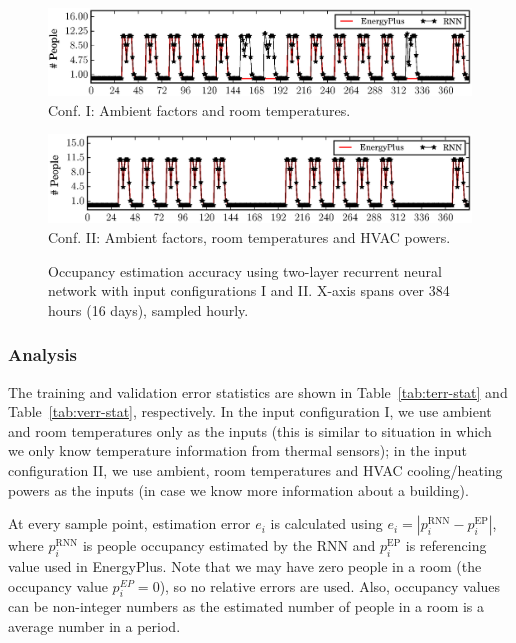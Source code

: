 \begin{figure}[h]

\begin{minipage}{\textwidth}
\centering\includegraphics[width=5in]{figs/results/2LRoomTOnlyDPFAugW3-4}
Conf. I: Ambient factors and room temperatures.
\end{minipage}
\hfill

\vspace{3ex}

\noindent\begin{minipage}{\textwidth}
\centering\includegraphics[width=5in]{figs/results/2LAmbHVACDPFAugW3-4}
Conf. II: Ambient factors, room temperatures and HVAC powers.
\end{minipage}
\hfill
\caption{Occupancy estimation accuracy using two-layer recurrent neural network
    with input configurations I and II. X-axis spans over 384 hours (16 days),
    sampled hourly.}\label{fig:two-layer}
\end{figure}


\subsubsection{Analysis}
The training and validation error statistics are shown in
Table~\ref{tab:terr-stat} and Table~\ref{tab:verr-stat}, respectively.
In the input configuration I, we use ambient and room temperatures
only as the inputs (this is similar to situation in which we only know
temperature information from thermal sensors); in the input
configuration II, we use ambient, room temperatures and HVAC
cooling/heating powers as the inputs (in case we know more information
about a building).

At every sample point, estimation error $e_i$ is calculated using
$e_i=\left|p_i^{\text{RNN}}-p_i^{\text{EP}}\right|$, where
$p_i^{\text{RNN}}$ is people occupancy estimated by the RNN and
$p_i^{\text{EP}}$ is referencing value used in EnergyPlus. Note that we may
have zero people in a room (the occupancy value $p_i^{EP} = 0$), so
no relative errors are used. Also, occupancy values can be
non-integer numbers as the estimated number of people in a room is a
average number in a period.

